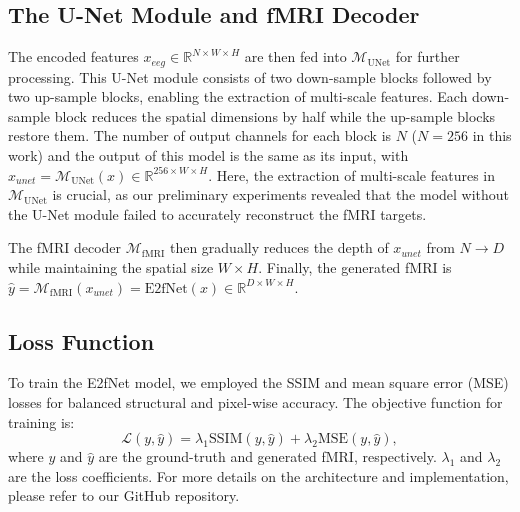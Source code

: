 \subsection{The U-Net Module and fMRI Decoder}
The encoded features $x_{eeg} \in \mathbb{R}^{N \times W \times H}$ are then fed into $\mathcal{M}_{\mathrm{UNet}}$ for further processing. 
This U-Net module consists of two down-sample blocks followed by two up-sample blocks, enabling the extraction of multi-scale features. 
Each down-sample block reduces the spatial dimensions by half while the up-sample blocks restore them. 
The number of output channels for each block is $N$ ($N=256$ in this work) and the output of this model is the same as its input, with $x_{unet}=\mathcal{M}_{\mathrm{UNet}}(x) \in \mathbb{R}^{256 \times W \times H}$. 
Here, the extraction of multi-scale features in $\mathcal{M}_{\mathrm{UNet}}$ is crucial, as our preliminary experiments revealed that the model without the U-Net module failed to accurately reconstruct the fMRI targets. 

The fMRI decoder $\mathcal{M}_{\mathrm{fMRI}}$ then gradually reduces the depth of $x_{unet}$ from $N \rightarrow D$ while maintaining the spatial size $W \times H$. 
Finally, the generated fMRI is $\hat{y} = \mathcal{M}_{\mathrm{fMRI}}(x_{unet}) = \mathrm{E2fNet}(x) \in \mathbb{R}^{D \times W \times H}$. 

\subsection{Loss Function}
To train the E2fNet model, we employed the SSIM and mean square error (MSE) losses for balanced structural and pixel-wise accuracy. 
The objective function for training is:
\begin{equation}
\label{eq:1}
\mathcal{L}(y, \hat{y}) = \lambda_{1} \mathrm{SSIM}(y, \hat{y}) + \lambda_{2} \mathrm{MSE}(y, \hat{y}),
\end{equation}
where $y$ and $\hat{y}$ are the ground-truth and generated fMRI, respectively. 
$\lambda_{1}$ and $\lambda_{2}$ are the loss coefficients. 
For more details on the architecture and implementation, please refer to our GitHub repository. 
